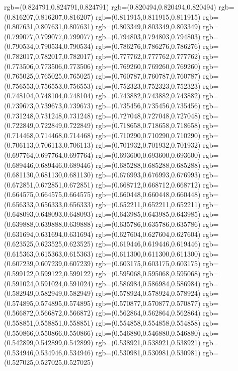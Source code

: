 {{{			rgb=(0.824791,0.824791,0.824791)
			rgb=(0.820494,0.820494,0.820494)
			rgb=(0.816207,0.816207,0.816207)
			rgb=(0.811915,0.811915,0.811915)
			rgb=(0.807631,0.807631,0.807631)
			rgb=(0.803349,0.803349,0.803349)
			rgb=(0.799077,0.799077,0.799077)
			rgb=(0.794803,0.794803,0.794803)
			rgb=(0.790534,0.790534,0.790534)
			rgb=(0.786276,0.786276,0.786276)
			rgb=(0.782017,0.782017,0.782017)
			rgb=(0.777762,0.777762,0.777762)
			rgb=(0.773506,0.773506,0.773506)
			rgb=(0.769260,0.769260,0.769260)
			rgb=(0.765025,0.765025,0.765025)
			rgb=(0.760787,0.760787,0.760787)
			rgb=(0.756553,0.756553,0.756553)
			rgb=(0.752323,0.752323,0.752323)
			rgb=(0.748104,0.748104,0.748104)
			rgb=(0.743882,0.743882,0.743882)
			rgb=(0.739673,0.739673,0.739673)
			rgb=(0.735456,0.735456,0.735456)
			rgb=(0.731248,0.731248,0.731248)
			rgb=(0.727048,0.727048,0.727048)
			rgb=(0.722849,0.722849,0.722849)
			rgb=(0.718658,0.718658,0.718658)
			rgb=(0.714468,0.714468,0.714468)
			rgb=(0.710290,0.710290,0.710290)
			rgb=(0.706113,0.706113,0.706113)
			rgb=(0.701932,0.701932,0.701932)
			rgb=(0.697764,0.697764,0.697764)
			rgb=(0.693600,0.693600,0.693600)
			rgb=(0.689446,0.689446,0.689446)
			rgb=(0.685288,0.685288,0.685288)
			rgb=(0.681130,0.681130,0.681130)
			rgb=(0.676993,0.676993,0.676993)
			rgb=(0.672851,0.672851,0.672851)
			rgb=(0.668712,0.668712,0.668712)
			rgb=(0.664575,0.664575,0.664575)
			rgb=(0.660448,0.660448,0.660448)
			rgb=(0.656333,0.656333,0.656333)
			rgb=(0.652211,0.652211,0.652211)
			rgb=(0.648093,0.648093,0.648093)
			rgb=(0.643985,0.643985,0.643985)
			rgb=(0.639888,0.639888,0.639888)
			rgb=(0.635786,0.635786,0.635786)
			rgb=(0.631694,0.631694,0.631694)
			rgb=(0.627604,0.627604,0.627604)
			rgb=(0.623525,0.623525,0.623525)
			rgb=(0.619446,0.619446,0.619446)
			rgb=(0.615363,0.615363,0.615363)
			rgb=(0.611300,0.611300,0.611300)
			rgb=(0.607239,0.607239,0.607239)
			rgb=(0.603175,0.603175,0.603175)
			rgb=(0.599122,0.599122,0.599122)
			rgb=(0.595068,0.595068,0.595068)
			rgb=(0.591024,0.591024,0.591024)
			rgb=(0.586984,0.586984,0.586984)
			rgb=(0.582949,0.582949,0.582949)
			rgb=(0.578924,0.578924,0.578924)
			rgb=(0.574895,0.574895,0.574895)
			rgb=(0.570877,0.570877,0.570877)
			rgb=(0.566872,0.566872,0.566872)
			rgb=(0.562864,0.562864,0.562864)
			rgb=(0.558851,0.558851,0.558851)
			rgb=(0.554858,0.554858,0.554858)
			rgb=(0.550866,0.550866,0.550866)
			rgb=(0.546880,0.546880,0.546880)
			rgb=(0.542899,0.542899,0.542899)
			rgb=(0.538921,0.538921,0.538921)
			rgb=(0.534946,0.534946,0.534946)
			rgb=(0.530981,0.530981,0.530981)
			rgb=(0.527025,0.527025,0.527025)
}}}
